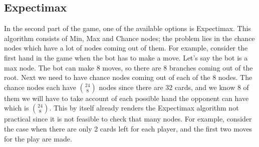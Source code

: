 \subsection{Expectimax}
\hspace{\parindent} In the second part of the game, one of the available options is Expectimax.
This algorithm consists of Min, Max and Chance nodes; the problem lies in the chance nodes which have a lot of nodes coming out of them.
For example, consider the first hand in the game when the bot has to make a move.
Let's say the bot is a max node.
The bot can make 8 moves, so there are 8 branches coming out of the root.
Next we need to have chance nodes coming out of each of the 8 nodes.
The chance nodes each have $\binom{24}{8}$ nodes since there are 32 cards, and we know 8 of them we will have to take account of each possible hand the opponent can have which is $\binom{24}{8}$.
This by itself already renders the Expectimax algorithm not practical since it is not feasible to check that many nodes.
For example, consider the case when there are only 2 cards left for each player, and the first two moves for the play are made.

\begin{center}
\end{center}

